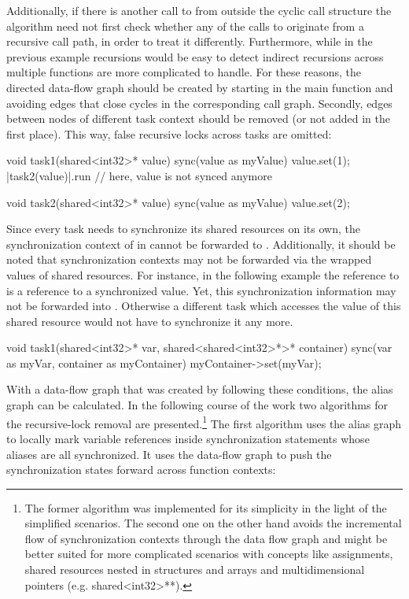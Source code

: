 Additionally, if there is another call to  from outside the cyclic call structure the algorithm need not first check whether any of the calls to  originate from a recursive call path, in order to treat it differently. Furthermore, while in the previous example recursions would be easy to detect indirect recursions across multiple functions are more complicated to handle. For these reasons, the directed data-flow graph should be created by starting in the main function and avoiding edges that close cycles in the corresponding call graph. Secondly, edges between nodes of different task context should be removed (or not added in the first place). This way, false recursive locks across tasks are omitted:
\begin{ccode}
void task1(shared<int32>* value) {
  sync(value as myValue) { value.set(1); 
    |task2(value)|.run                   // here, value is not synced anymore
  }
}

void task2(shared<int32>* value) {
  sync(value as myValue) { value.set(2); }
}
\end{ccode}
Since every task needs to synchronize its shared resources on its own, the synchronization context of  in  cannot be forwarded to . Additionally, it should be noted that synchronization contexts may not be forwarded via the wrapped values of shared resources. For instance, in the following example the reference to  is a reference to a synchronized value. Yet, this synchronization information may not be forwarded into . Otherwise a different task which accesses the value of this shared resource would not have to synchronize it any more.
\begin{ccode}
void task1(shared<int32>* var, shared<shared<int32>*>* container) {
  sync(var as myVar, container as myContainer) {
    myContainer->set(myVar);
  }
}
\end{ccode}
With a data-flow graph that was created by following these conditions, the alias graph can be calculated. In the following course of the work two algorithms for the recursive-lock removal are presented.\footnote{The former algorithm was implemented for its simplicity in the light of the simplified scenarios. The second one on the other hand avoids the incremental flow of synchronization contexts through the data flow graph and might be better suited for more complicated scenarios with concepts like assignments, shared resources nested in structures and arrays and multidimensional pointers (e.g. shared<int32>**).} The first algorithm uses the alias graph to locally mark variable references inside synchronization statements whose aliases are all synchronized. It uses the data-flow graph to push the synchronization states forward across function contexts:

